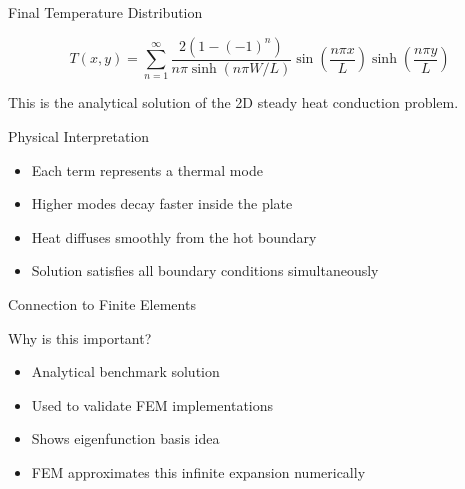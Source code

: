 \documentclass{beamer}
\begin{document}
\begin{frame}{Final Temperature Distribution}

\[
T(x,y)=
\sum_{n=1}^{\infty}
\frac{2(1-(-1)^n)}
{n\pi\sinh(n\pi W/L)}
\sin\left(\frac{n\pi x}{L}\right)
\sinh\left(\frac{n\pi y}{L}\right)
\]

This is the analytical solution of the 2D steady heat conduction problem.

\end{frame}

\begin{frame}{Physical Interpretation}

\begin{itemize}
\item Each term represents a thermal mode
\item Higher modes decay faster inside the plate
\item Heat diffuses smoothly from the hot boundary
\item Solution satisfies all boundary conditions simultaneously
\end{itemize}

\end{frame}

\begin{frame}{Connection to Finite Elements}

Why is this important?

\begin{itemize}
\item Analytical benchmark solution
\item Used to validate FEM implementations
\item Shows eigenfunction basis idea
\item FEM approximates this infinite expansion numerically
\end{itemize}

\end{frame}
\end{document}

